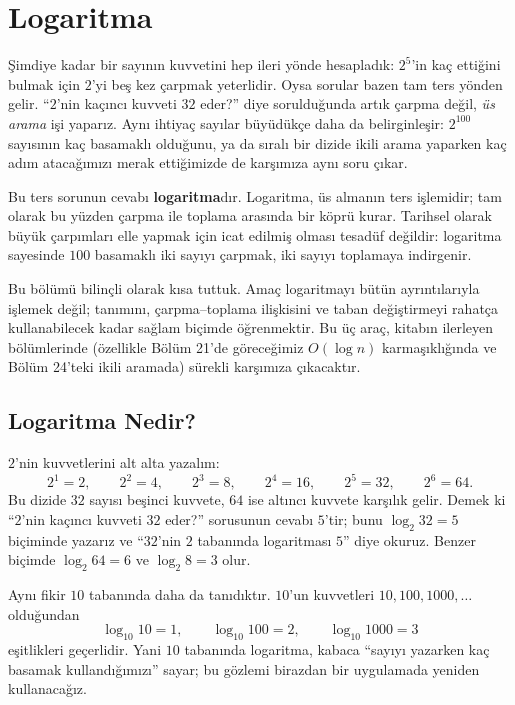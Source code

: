 \chapter[Logaritma · \textit{Orta}]{Logaritma}

Şimdiye kadar bir sayının kuvvetini hep ileri yönde hesapladık: $2^5$'in kaç ettiğini bulmak için $2$'yi beş kez çarpmak yeterlidir. Oysa sorular bazen tam ters yönden gelir. ``$2$'nin kaçıncı kuvveti $32$ eder?'' diye sorulduğunda artık çarpma değil, \emph{üs arama} işi yaparız. Aynı ihtiyaç sayılar büyüdükçe daha da belirginleşir: $2^{100}$ sayısının kaç basamaklı olduğunu, ya da sıralı bir dizide ikili arama yaparken kaç adım atacağımızı merak ettiğimizde de karşımıza aynı soru çıkar.

Bu ters sorunun cevabı \textbf{logaritma}dır. Logaritma, üs almanın ters işlemidir; tam olarak bu yüzden çarpma ile toplama arasında bir köprü kurar. Tarihsel olarak büyük çarpımları elle yapmak için icat edilmiş olması tesadüf değildir: logaritma sayesinde $100$ basamaklı iki sayıyı çarpmak, iki sayıyı toplamaya indirgenir.

Bu bölümü bilinçli olarak kısa tuttuk. Amaç logaritmayı bütün ayrıntılarıyla işlemek değil; tanımını, çarpma--toplama ilişkisini ve taban değiştirmeyi rahatça kullanabilecek kadar sağlam biçimde öğrenmektir. Bu üç araç, kitabın ilerleyen bölümlerinde (özellikle Bölüm 21'de göreceğimiz $O(\log n)$ karmaşıklığında ve Bölüm 24'teki ikili aramada) sürekli karşımıza çıkacaktır.

\section{Logaritma Nedir?}

$2$'nin kuvvetlerini alt alta yazalım:
\[
2^1 = 2, \qquad 2^2 = 4, \qquad 2^3 = 8, \qquad 2^4 = 16, \qquad 2^5 = 32, \qquad 2^6 = 64.
\]
Bu dizide $32$ sayısı beşinci kuvvete, $64$ ise altıncı kuvvete karşılık gelir. Demek ki ``$2$'nin kaçıncı kuvveti $32$ eder?'' sorusunun cevabı $5$'tir; bunu $\log_2 32 = 5$ biçiminde yazarız ve ``$32$'nin $2$ tabanında logaritması $5$'' diye okuruz. Benzer biçimde $\log_2 64 = 6$ ve $\log_2 8 = 3$ olur.

Aynı fikir $10$ tabanında daha da tanıdıktır. $10$'un kuvvetleri $10, 100, 1000, \dots$ olduğundan
\[
\log_{10} 10 = 1, \qquad \log_{10} 100 = 2, \qquad \log_{10} 1000 = 3
\]
eşitlikleri geçerlidir. Yani $10$ tabanında logaritma, kabaca ``sayıyı yazarken kaç basamak kullandığımızı'' sayar; bu gözlemi birazdan bir uygulamada yeniden kullanacağız.

